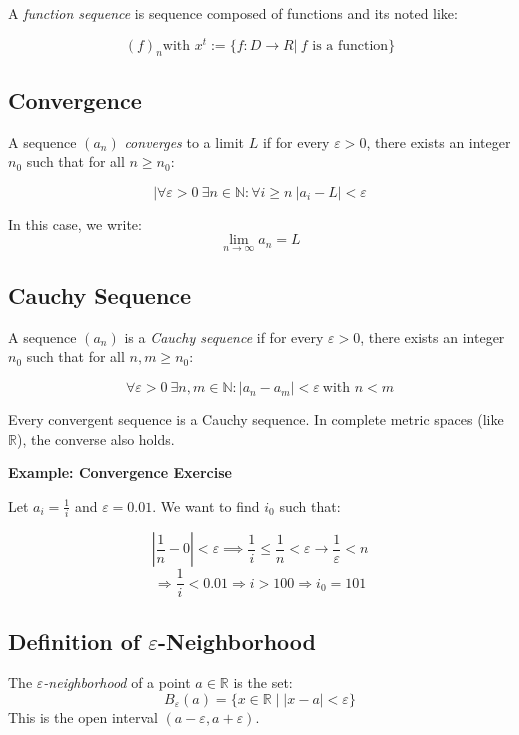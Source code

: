 A \emph{function sequence} is sequence composed of functions and its noted like:

\[
{(f)}_n \text{with } x^t := \{ f: D\to R | \ f \text{ is a function}\}
\]

\subsection{Convergence}

A sequence \((a_n)\) \emph{converges} to a limit \(L\) if for every \(\varepsilon > 0\), there exists an integer \(n_0\) such that for all \(n \ge n_0\):

\[
|\forall \varepsilon > 0\ \exists n \in \mathbb{N}: \forall i \ge n\ |a_i - L| < \varepsilon
\]

In this case, we write:
\[
\lim_{n \to \infty} a_n = L
\]

\subsection{Cauchy Sequence}

A sequence \((a_n)\) is a \emph{Cauchy sequence} if for every \(\varepsilon > 0\), there exists an integer \(n_0\) such that for all \(n, m \ge n_0\):

\[
\forall \varepsilon > 0\ \exists n,m \in \mathbb{N}: |a_n - a_m| < \varepsilon\ \text{with } n < m
\]

Every convergent sequence is a Cauchy sequence. In complete metric spaces (like \(\mathbb{R}\)), the converse also holds.

\textbf{Example: Convergence Exercise}

Let \(a_i = \frac{1}{i}\) and \(\varepsilon = 0.01\). We want to find \(i_0\) such that:

\[
\left|\frac{1}{n} - 0\right| < \varepsilon \implies \frac{1}{i} \le \frac{1}{n} < \varepsilon \rightarrow \frac{1}{\varepsilon} < n
\]
\[
\Rightarrow \frac{1}{i} < 0.01 \Rightarrow i > 100
\Rightarrow i_0 = 101
\]

\subsection{Definition of \texorpdfstring{\(\varepsilon\)}{ε}-Neighborhood}

The \emph{\(\varepsilon\)-neighborhood} of a point \(a \in \mathbb{R}\) is the set:
\[
B_\varepsilon(a) = \{x \in \mathbb{R} \mid |x - a| < \varepsilon\}
\]
This is the open interval \((a - \varepsilon, a + \varepsilon)\).

